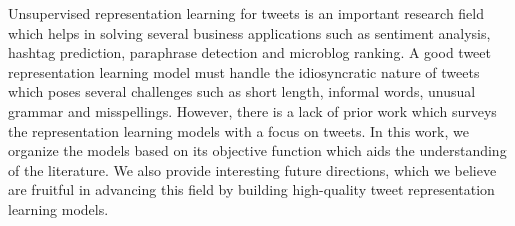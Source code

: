 Unsupervised representation learning for tweets is an important research field which helps in solving several business applications such as sentiment analysis, hashtag prediction, paraphrase detection and microblog ranking. A good tweet representation learning model must handle the idiosyncratic nature of tweets which poses several challenges such as short length, informal words, unusual grammar and misspellings. However, there is a lack of prior work which surveys the representation learning models with a focus on tweets. In this work, we organize the models based on its objective function which aids the understanding of the literature. We also provide interesting future directions, which we believe are fruitful in advancing this field by building high-quality tweet representation learning models.
